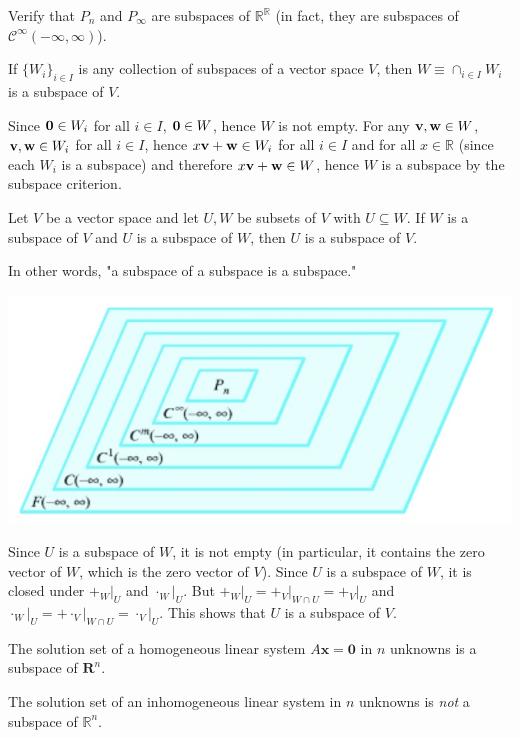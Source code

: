 \documentclass[12pt,letterpaper,reqno]{article}
\numberwithin{equation}{section}
\newcommand{\fixme}[1]{{\color{orange}{[#1]}}}
\begin{document}
\begin{exercise}
Verify that $P_n$ and $P_\infty$ are subspaces of $\mathbb{R}^{\mathbb{R}}$ (in fact, they are subspaces of $\mathscr{C}^\infty(-\infty,\infty)$).	
\end{exercise}


\begin{thm}\label{thm:intersection_of_subspaces}
	If $\{W_i\}_{i \in I}$ is any collection of subspaces of a vector space $V$, then $W\equiv \cap_{i \in I}W_i$ is a subspace of $V$.
\end{thm}

\begin{pf}
	Since ${\bf 0} \in W_i$ for all $i\in I$, ${\bf 0} \in W$, hence $W$ is not empty. For any ${\bf v},{\bf w} \in W$, ${\bf v},{\bf w} \in W_i$ for all $i \in I$, hence $x{\bf v}+{\bf w} \in W_i$ for all $i \in I$ and for all $x\in \mathbb{R}$ (since each $W_i$ is a subspace) and therefore $x{\bf v}+{\bf w} \in W$, hence $W$ is a subspace by the subspace criterion.
\end{pf}

\begin{thm}
	\fixme{Need to edit this.} Let $V$ be a vector space and let $U,W$ be subsets of $V$ with $U \subseteq W$. If $W$ is a subspace of $V$ and $U$ is a subspace of $W$, then $U$ is a subspace of $V$.
	
	In other words, "a subspace of a subspace is a subspace."
\end{thm}
\begin{center}
	\includegraphics[scale=0.5]{figures_mvc/nested}
\end{center}

\begin{pf}
	Since $U$ is a subspace of $W$, it is not empty (in particular, it contains the zero vector of $W$, which is the zero vector of $V$). Since $U$ is a subspace of $W$, it is closed under $+_W\vert_U$ and $\cdot_W\vert_U$. But $+_W\vert_U=+_V\vert_{W \cap U}=+_V\vert_U$ and $\cdot_W\vert_U=+\cdot_V\vert_{W \cap U}=\cdot_V\vert_U$. This shows that $U$ is a subspace of $V$.
\end{pf}

\begin{example}
The solution set of a homogeneous linear system $A\mathbf{x}=\mathbf{0}$ in $n$ unknowns is a subspace of $\mathbf{R}^n$. \fixme{Work out the details.}

The solution set of an inhomogeneous linear system in $n$ unknowns is \emph{not} a subspace of $\mathbb{R}^n$. \fixme{Work out the details.}
\end{example}
\end{document}

